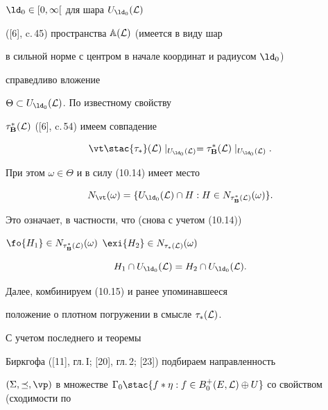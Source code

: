 \begin{pf}
${{\ld}_0} \in [0,\infty[$ для шара ${U_{{\ld}_0}}({\cal L})$


([6], c.\,45) пространства ${\Bbb A}({\cal L})$ (имеется в виду шар


в сильной норме с центром в начале координат и радиусом ${\ld}_0$)


справедливо вложение


$\Theta \subset {U_{{\ld}_0}}({\cal L})$. По известному свойству


${\tau_{\bold B}^*}({\cal L})$ ([6], c.\,54) имеем совпадение


\begin{equation}


\vt \stac {{\tau}_*}({\cal L})\mid_{{U_{{\ld}_0}}({\cal L})} =


{{\tau}_{\bold B}^*}({\cal L})\mid_{{U_{{\ld}_0}}({\cal L})}.


\end{equation}


При этом $\omega \in \Theta$ и в силу (10.14) имеет место


$$


{N_\vt}(\omega) = \{{U_{{\ld}_0}}({\cal L}) \cap H:H \in


{N_{{\tau_{\bold B}^*}({\cal L})}}(\omega)\}.


$$


Это означает, в частности, что (снова с учетом (10.14))


$\fo{H_1} \in


{N_{{\tau_{\bold B}^*}({\cal L})}}(\omega)$ $\exi{H_2} \in


{N_{{\tau_*}({\cal L})}}(\omega)$


\begin{equation}


{H_1} \cap {U_{{\ld}_0}}({\cal L}) = {H_2} \cap {U_{{\ld}_0}}({\cal L}).


\end{equation}





Далее, комбинируем (10.15) и ранее упоминавшееся


положение о плотном погружении в смысле ${{\tau}_*}({\cal L})$.


С учетом последнего и теоремы


Биркгофа ([11], гл.\,I; [20], гл.\,2; [23]) подбираем направленность


$(\Sigma,\preceq,\vp)$ в множестве ${{\Gamma}_0} \stac \{{f*\eta}:


f \in {B_0^+}(E,{\cal L}) \oplus U\}$ со свойством (сходимости по



\end{pf}
